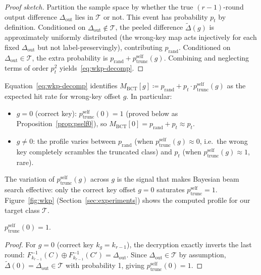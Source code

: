 \documentclass[runningheads]{llncs}
\newcommand{\pself}{p^{\mathrm{self}}_{\mathrm{trunc}}}
\newcommand{\xor}{\oplus}
\begin{document}
\begin{proof}[Proof sketch]
  Partition the sample space by whether the true $(r{-}1)$-round output
  difference $\Delta_{\mathrm{out}}$ lies in $\mathcal{T}$ or not.  This
  event has probability $p_t$ by definition.  Conditioned on
  $\Delta_{\mathrm{out}} \notin \mathcal{T}$, the peeled difference
  $\widetilde\Delta(g)$ is approximately uniformly distributed (the
  wrong-key map acts injectively for each fixed $\Delta_{\mathrm{out}}$
  but not label-preservingly), contributing $p_{\mathrm{rand}}$.
  Conditioned on $\Delta_{\mathrm{out}} \in \mathcal{T}$, the extra
  probability is $p_{\mathrm{rand}} + \pself(g)$.  Combining and
  neglecting terms of order $p_t^2$ yields~\eqref{eq:wkp-decomp}.
\end{proof}

Equation~\eqref{eq:wkp-decomp} identifies $M_{\mathrm{BCT}}[g] \coloneqq
p_{\mathrm{rand}} + p_t \cdot \pself(g)$ as the expected hit rate for
wrong-key offset $g$.  In particular:
\begin{itemize}
  \item $g = 0$ (correct key): $\pself(0) = 1$ (proved below as
    Proposition~\ref{prop:pself0}), so
    $M_{\mathrm{BCT}}[0] = p_{\mathrm{rand}} + p_t \approx p_t$.
  \item $g \ne 0$: the profile varies between $p_{\mathrm{rand}}$ (when
    $\pself(g) \approx 0$, i.e.\ the wrong key completely scrambles the
    truncated class) and $p_t$ (when $\pself(g) \approx 1$, rare).
\end{itemize}
The variation of $\pself(g)$ across $g$ is the signal that makes Bayesian
beam search effective: only the correct key offset $g = 0$ saturates
$\pself = 1$.  Figure~\ref{fig:wkp} (Section~\ref{sec:experiments})
shows the computed profile for our target class $\mathcal{T}$.

\begin{proposition}
  \label{prop:pself0}
  $\pself(0) = 1$.
\end{proposition}
\begin{proof}
  For $g = 0$ (correct key $k_g = k_{r-1}$), the decryption exactly inverts
  the last round:
  $F_{k_{r-1}}^{-1}(C) \xor F_{k_{r-1}}^{-1}(C') = \Delta_{\mathrm{out}}$.
  Since $\Delta_{\mathrm{out}} \in \mathcal{T}$ by assumption,
  $\widetilde\Delta(0) = \Delta_{\mathrm{out}} \in \mathcal{T}$ with
  probability 1, giving $\pself(0) = 1$.
\end{proof}

\end{document}
